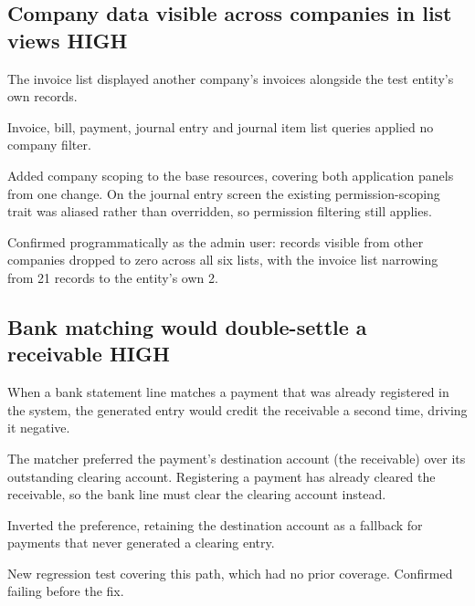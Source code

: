 \documentclass[11pt,a4paper]{article}
\newcommand{\sev}[2]{\textcolor{#1}{\small\textsf{\textbf{#2}}}}
\begin{document}
\subsection[Company data visible across companies in list views]{Company data visible across companies in list views \hfill \sev{high}{HIGH}}

\begin{description}[leftmargin=!, labelwidth=2.4cm, font=\small\sffamily\bfseries\color{muted}]
  \item[Symptom] The invoice list displayed another company's invoices alongside the test entity's own
    records.
  \item[Root cause] Invoice, bill, payment, journal entry and journal item list queries applied no
    company filter.
  \item[Fix] Added company scoping to the base resources, covering both application panels from one
    change. On the journal entry screen the existing permission-scoping trait was aliased rather than
    overridden, so permission filtering still applies.
  \item[Verification] Confirmed programmatically as the admin user: records visible from other companies
    dropped to zero across all six lists, with the invoice list narrowing from 21 records to the entity's
    own 2.
\end{description}

\subsection[Bank matching would double-settle a receivable]{Bank matching would double-settle a receivable \hfill \sev{high}{HIGH}}

\begin{description}[leftmargin=!, labelwidth=2.4cm, font=\small\sffamily\bfseries\color{muted}]
  \item[Symptom] When a bank statement line matches a payment that was already registered in the
    system, the generated entry would credit the receivable a second time, driving it negative.
  \item[Root cause] The matcher preferred the payment's destination account (the receivable) over its
    outstanding clearing account. Registering a payment has already cleared the receivable, so the bank
    line must clear the clearing account instead.
  \item[Fix] Inverted the preference, retaining the destination account as a fallback for payments that
    never generated a clearing entry.
  \item[Verification] New regression test covering this path, which had no prior coverage. Confirmed
    failing before the fix.
\end{description}
\end{document}

